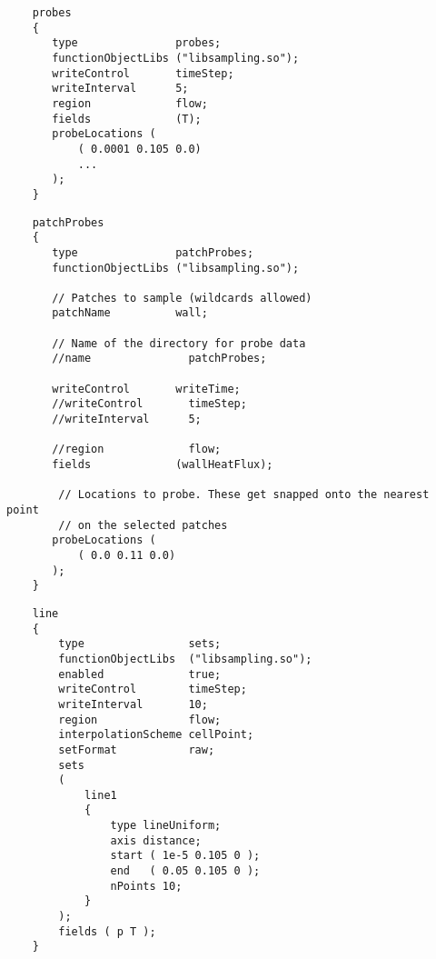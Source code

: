 \documentclass[a4paper, 12pt]{article}
\numberwithin{equation}{section}
\begin{document}
    \begin{minipage}{\textwidth}
    \vspace{12pt}
    {
    \begin{verbatim}
    probes
    {
       type               probes;
       functionObjectLibs ("libsampling.so");
       writeControl       timeStep;
       writeInterval      5;
       region             flow;
       fields             (T);
       probeLocations (
           ( 0.0001 0.105 0.0)
           ...
       );
    }
    \end{verbatim}
    }
    \end{minipage}



    \begin{minipage}{\textwidth}
    \vspace{12pt}
    {
    \begin{verbatim}
    patchProbes
    {
       type               patchProbes;
       functionObjectLibs ("libsampling.so");

       // Patches to sample (wildcards allowed)
       patchName          wall;

       // Name of the directory for probe data
       //name               patchProbes;

       writeControl       writeTime;
       //writeControl       timeStep;
       //writeInterval      5;

       //region             flow;
       fields             (wallHeatFlux);

        // Locations to probe. These get snapped onto the nearest point
        // on the selected patches
       probeLocations (
           ( 0.0 0.11 0.0)
       );
    }

    \end{verbatim}
    }
    \end{minipage}

    \begin{minipage}{\textwidth}
    \vspace{12pt}
    {
    \begin{verbatim}
    line
    {
        type                sets;
        functionObjectLibs  ("libsampling.so");
        enabled             true;
        writeControl        timeStep;
        writeInterval       10;
        region              flow;
        interpolationScheme cellPoint;
        setFormat           raw;
        sets
        (
            line1
            {
                type lineUniform;
                axis distance;
                start ( 1e-5 0.105 0 );
                end   ( 0.05 0.105 0 );
                nPoints 10;
            }
        );
        fields ( p T );
    }
    \end{verbatim}
    }
    \end{minipage}
\end{document}
